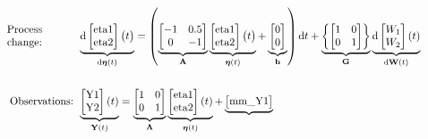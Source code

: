 \documentclass[a4paper]{article}
\newcommand{\vect}[1]{\boldsymbol{\mathbf{#1}}}
\begin{document}
 \begin{normalsize}
 \setcounter{MaxMatrixCols}{200}
  \begin{align*}
      \parbox{10em}{\centering{Process\linebreak change:}}
  &\underbrace{\mathrm{d}
    \begin{bmatrix}
\text{eta1}\\ 
\text{eta2}
\end{bmatrix} 
    \big{(}t\big{)}}_{\mathrm{d} \vect{\eta} (t)}	=  \left(
      \underbrace{
        \begin{bmatrix}
-1 & 0.5\\ 
0 & -1
\end{bmatrix}
      }_{{\vect{A}}} \underbrace{
        \begin{bmatrix}
\text{eta1}\\ 
\text{eta2}
\end{bmatrix} 
        \big{(}t\big{)}
      }_{\vect{\eta} (t)}	+ \underbrace{
        \begin{bmatrix}
0\\ 
0
\end{bmatrix}
      }_{{\vect{b}}}\right) \mathrm{d}t +
   \underbrace{\left\{
      \begin{bmatrix}
1 & 0\\ 
0 & 1
\end{bmatrix}\right\}
    }_{{\vect{G}}}
    \underbrace{\mathrm{d}
      \begin{bmatrix}
W_{1}\\ 
W_{2}
\end{bmatrix} 
      (t)}_{\mathrm{d} \vect{W}(t)} \\ \\
              \textrm{Observations: }
&\underbrace{
      \begin{bmatrix}
\text{Y1}\\ 
\text{Y2}
\end{bmatrix}  
      (t)}_{\vect{Y}(t)} = 
        \underbrace{
          \begin{bmatrix}
1 & 0\\ 
0 & 1
\end{bmatrix} 
        }_{{\vect{\Lambda}}} \underbrace{
          \begin{bmatrix}
\text{eta1}\\ 
\text{eta2}
\end{bmatrix} 
          (t)}_{\vect{\eta}(t)} +
        \underbrace{
          \begin{bmatrix}
\text{mm\_Y1}\\ 

\end{bmatrix}}
\end{align*}
\end{normalsize}
\end{document}
